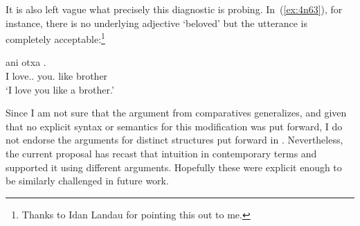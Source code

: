 \begin{exe}
\begin{xlist}
\begin{xlist}
\begin{exe}
\begin{exe}
\begin{xlist}
\begin{exe}
\begin{xlist}
\begin{exe}
\begin{xlist}
\begin{xlist}
\begin{exe}
\begin{xlist}
\begin{exe}
\begin{xlist}
\begin{exe}
\begin{xlist}
\begin{exe}
\begin{exe}
\begin{exe}
\begin{xlist}
\begin{exe}
\begin{exe}
\begin{xlist}
\begin{xlist}
\begin{exe}
\begin{xlist}
\begin{exe}
\begin{exe}
\begin{xlist}
\begin{exe}
\begin{exe}
\begin{xlist}
\begin{exe}
\begin{xlist}
\begin{exe}
\begin{xlist}
\begin{exe}
\begin{xlist}
\begin{exe}
\begin{exe}
\begin{xlist}
\begin{exe}
\begin{exe}
\begin{xlist}
\begin{xlist}
\begin{exe}
\begin{xlist}
\begin{xlist}
\begin{exe}
\begin{xlist}
\begin{exe}
\begin{xlist}
\begin{exe}
\begin{xlist}
\begin{exe}
\begin{xlist}
\begin{exe}
\begin{exe}
\begin{exe}
\begin{exe}
\begin{xlist}
\begin{exe}
\begin{exe}
\begin{xlist}
\begin{xlist}
\begin{exe}
\begin{exe}
\begin{xlist}
\begin{exe}
\begin{xlist}
\begin{exe}
\begin{xlist}
\begin{exe}
\begin{xlist}
\begin{exe}
\begin{xlist}
\begin{exe}
\begin{exe}
\begin{exe}
\begin{exe}
\begin{xlist}
\begin{exe}
\begin{xlist}
\begin{exe}
\begin{xlist}
\begin{exe}
\begin{xlist}
\begin{exe}
\begin{xlist}
\begin{exe}
\begin{xlist}
It is also left vague what precisely this diagnostic is probing. In~(\ref{ex:4n63}), for instance, there is no underlying adjective `beloved' but the utterance is completely acceptable:\footnote{Thanks to Idan Landau for pointing this out to me.}

 \begin{exe}
\ex  \label{ex:4n63}
	{ \gll ani  otxa  .\\
 	  I love.. you. like brother\\
 	\glt `I love you like a brother.' } 
 \z 

Since I am not sure that the argument from comparatives generalizes, and given that no explicit syntax or semantics for this modification was put forward, I do not endorse the arguments for distinct structures put forward in \cite{borer91}. Nevertheless, the current proposal has recast that intuition in contemporary terms and supported it using different arguments. Hopefully these were explicit enough to be similarly challenged in future work.



\end{exe}
\end{xlist}
\end{exe}
\end{xlist}
\end{exe}
\end{xlist}
\end{exe}
\end{xlist}
\end{exe}
\end{xlist}
\end{exe}
\end{xlist}
\end{exe}
\end{exe}
\end{exe}
\end{exe}
\end{xlist}
\end{exe}
\end{xlist}
\end{exe}
\end{xlist}
\end{exe}
\end{xlist}
\end{exe}
\end{xlist}
\end{exe}
\end{exe}
\end{xlist}
\end{xlist}
\end{exe}
\end{exe}
\end{xlist}
\end{exe}
\end{exe}
\end{exe}
\end{exe}
\end{xlist}
\end{exe}
\end{xlist}
\end{exe}
\end{xlist}
\end{exe}
\end{xlist}
\end{exe}
\end{xlist}
\end{xlist}
\end{exe}
\end{xlist}
\end{xlist}
\end{exe}
\end{exe}
\end{xlist}
\end{exe}
\end{exe}
\end{xlist}
\end{exe}
\end{xlist}
\end{exe}
\end{xlist}
\end{exe}
\end{xlist}
\end{exe}
\end{exe}
\end{xlist}
\end{exe}
\end{exe}
\end{xlist}
\end{exe}
\end{xlist}
\end{xlist}
\end{exe}
\end{exe}
\end{xlist}
\end{exe}
\end{exe}
\end{exe}
\end{xlist}
\end{exe}
\end{xlist}
\end{exe}
\end{xlist}
\end{exe}
\end{xlist}
\end{xlist}
\end{exe}
\end{xlist}
\end{exe}
\end{xlist}
\end{exe}
\end{exe}
\end{xlist}
\end{xlist}
\end{exe}
